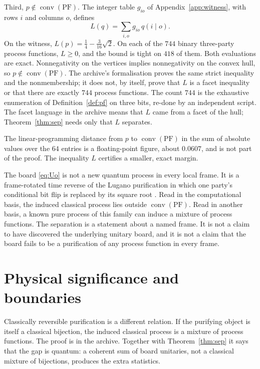 \documentclass[11pt]{article}
\theoremstyle{definition}
\theoremstyle{remark}
\newcommand{\conv}{\operatorname{conv}}
\newcommand{\PF}{\mathrm{PF}}
\begin{document}
Third, \(p\notin\conv(\PF)\). The integer table \(g_{io}\) of Appendix~\ref{app:witness}, with rows \(i\) and columns \(o\), defines
\begin{equation}
\label{eq:g}
L(q)=\sum_{i,o} g_{io}\,q(i\mid o).
\end{equation}
On the witness, \(L(p)=\tfrac14-\tfrac{3}{16}\sqrt{2}\). On each of the \(744\) binary three-party process functions, \(L\ge 0\), and the bound is tight on \(418\) of them. Both evaluations are exact. Nonnegativity on the vertices implies nonnegativity on the convex hull, so \(p\notin\conv(\PF)\). The archive's formalisation proves the same strict inequality and the nonmembership; it does not, by itself, prove that \(L\) is a facet inequality or that there are exactly \(744\) process functions. The count \(744\) is the exhaustive enumeration of Definition~\ref{def:pf} on three bits, re-done by an independent script. The facet language in the archive means that \(L\) came from a facet of the hull; Theorem~\ref{thm:sep} needs only that \(L\) separates.

The linear-programming distance from \(p\) to \(\conv(\PF)\) in the sum of absolute values over the \(64\) entries is a floating-point figure, about \(0.0607\), and is not part of the proof. The inequality \(L\) certifies a smaller, exact margin.

The board \eqref{eq:Uo} is not a new quantum process in every local frame. It is a frame-rotated time reverse of the Lugano purification in which one party's conditional bit flip is replaced by its square root \cite{guerin2018,archive}. Read in the computational basis, the induced classical process lies outside \(\conv(\PF)\). Read in another basis, a known pure process of this family can induce a mixture of process functions. The separation is a statement about a named frame. It is not a claim to have discovered the underlying unitary board, and it is not a claim that the board fails to be a purification of any process function in every frame.

\section{Physical significance and boundaries}
\label{sec:bounds}

Classically reversible purification is a different relation. If the purifying object is itself a classical bijection, the induced classical process is a mixture of process functions. The proof is in the archive. Together with Theorem~\ref{thm:sep} it says that the gap is quantum: a coherent sum of board unitaries, not a classical mixture of bijections, produces the extra statistics.
\end{document}
